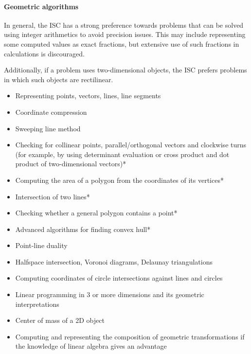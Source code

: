 \documentclass[12pt]{article}
\begin{document}
		\paragraph{Geometric algorithms}
		In general, the ISC has a strong preference towards problems that can be solved using integer arithmetics to avoid precision issues. This may include representing some computed values as exact fractions, but extensive use of such fractions in calculations is discouraged.
		
		Additionally, if a problem uses two-dimensional objects, the ISC prefers problems in which such objects are rectilinear.
		
		\begin{itemize}[label=]
			\item Representing points, vectors, lines, line segments
			\item Coordinate compression
			\item Sweeping line method
		\end{itemize}
	
		\begin{itemize}[label=]
			\item Checking for collinear points, parallel/orthogonal vectors and clockwise turns (for example, by using determinant evaluation or cross product and dot product of two-dimensional vectors)*
			\item Computing the area of a polygon from the coordinates of its vertices*
			\item Intersection of two lines*
			\item Checking whether a general polygon contains a point*
			\item Advanced algorithms for finding convex hull* 
			\item Point-line duality
			\item Halfspace intersection, Voronoi diagrams, Delaunay triangulations
			\item Computing coordinates of circle intersections against lines and circles
			\item Linear programming in $3$ or more dimensions and its geometric interpretations
			\item Center of mass of a 2D object
			\item Computing and representing the composition of geometric transformations if the knowledge of linear algebra gives an advantage
		\end{itemize}
		
\end{document}
